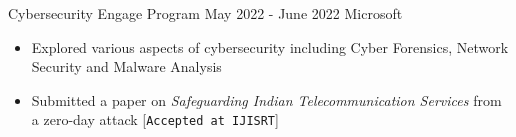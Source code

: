 \excventry
{Cybersecurity Engage Program}
{May 2022 - June 2022}
{Microsoft}
{
  \begin{itemize}
    \item Explored various aspects of cybersecurity including Cyber Forensics, Network Security and Malware Analysis
    \item Submitted a paper on \textit{Safeguarding Indian Telecommunication Services} from a zero-day attack [\texttt{Accepted at IJISRT}]
  \end{itemize}
}

